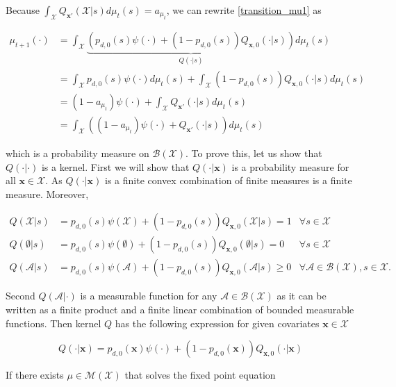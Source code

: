 \documentclass[12pt,a4paper]{article}
\newcommand{\bx}{\mathbf{x}}
\begin{document}
	\noindent Because $\int_{\mathcal{X}} Q_{\bx'}(\mathcal{X}|s) d\mu_t(s)=a_{\mu_t}$, we can rewrite \eqref{transition_mu1} as
	
	\begin{align} \label{transition_mu}
		\mu_{t+1}(\cdot)&= \int_{\mathcal{X}} \underbrace{\left(p_{d,0}(s)\psi(\cdot)+(1-p_{d,0}(s))Q_{\bx,0}(\cdot|s) \right)}_{Q(\cdot | s)} d\mu_t(s)\\
		&= \int_{\mathcal{X}} p_{d,0}(s)\psi(\cdot) d\mu_t(s)+\int_{\mathcal{X}} (1-p_{d,0}(s))Q_{\bx,0}(\cdot|s) d\mu_t(s)\\
		&= (1-a_{\mu_t})\psi(\cdot) +\int_{\mathcal{X}} Q_{\bx'}(\cdot|s) d\mu_t(s)\\
		&=\int_{\mathcal{X}} ((1-a_{\mu_t})\psi(\cdot)+Q_{\bx'}(\cdot|s)) d\mu_t(s)
	\end{align}
	
	\noindent which is a probability measure on $\mathcal{B}(\mathcal{X})$. To prove this, let us show that $Q(\cdot|\cdot)$ is a kernel. First we will show that $Q(\cdot|\bx)$ is a probability measure for all $\bx \in \mathcal{X}$. As $Q(\cdot|\bx)$ is a finite convex combination of finite measures is a finite measure. Moreover, 
		
		\begin{align*}
			Q(\mathcal{X}|s)&=p_{d,0}(s)\psi(\mathcal{X})+(1-p_{d,0}(s))Q_{\bx,0}(\mathcal{X}|s) =1 & \forall s \in \mathcal{X}\\
			Q(\emptyset|s)&=p_{d,0}(s)\psi(\emptyset)+(1-p_{d,0}(s))Q_{\bx,0}(\emptyset|s) =0 & \forall  s \in \mathcal{X}\\
			Q(\mathcal{A}|s)&=p_{d,0}(s)\psi(\mathcal{A})+(1-p_{d,0}(s))Q_{\bx,0}(\mathcal{A}|s) \geq 0 & \forall \mathcal{A} \in \mathcal{B}(\mathcal{X}), s \in \mathcal{X}.
		\end{align*}
		
		\noindent Second $Q(\mathcal{A}|\cdot)$ is a measurable function for any $\mathcal{A} \in \mathcal{B}(\mathcal{X})$ as it can be written as a finite product and a finite linear combination of bounded measurable functions. Then kernel $Q$ has the following expression for given covariates $\bx \in \mathcal{X}$
	
	\begin{equation}
		Q(\cdot | \bx)=p_{d,0}(\bx)\psi(\cdot)+(1-p_{d,0}(\bx))Q_{\bx,0}(\cdot|\bx)
	\end{equation} 
	
	



	
	If there exists $\mu \in \mathcal{M}(\mathcal{X})$ that solves the fixed point equation
	
\end{document}

